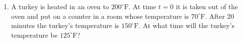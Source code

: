 \documentclass[10pt]{article}
\begin{document}
\begin{enumerate}[leftmargin=*, label=\numbox{\arabic*}, resume]
\item
    \begin{problem}[\vspace{5cm}]
        A turkey is heated in an oven to \(200^\circ\mathrm{F}\). At time \(t = 0\) it
        is taken out of the oven and put on a counter in a room whose temperature is
        \(70^\circ\mathrm{F}\). After 20 minutes the turkey's temperature is
        \(150^\circ\mathrm{F}\). At what time will the turkey's temperature be
        \(125^\circ\mathrm{F}\)?
    \end{problem}

\end{enumerate}
\end{document}
